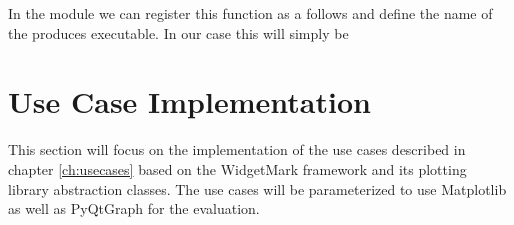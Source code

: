 

In the module  we can register this function as
a  follows and define the name of the
produces executable. In our case this will simply be







\section{Use Case Implementation}

This section will focus on the implementation of the use cases described in
chapter \ref{ch:usecases} based on the WidgetMark framework and its plotting
library abstraction classes. The use cases will be parameterized to use
Matplotlib as well as PyQtGraph for the evaluation.

